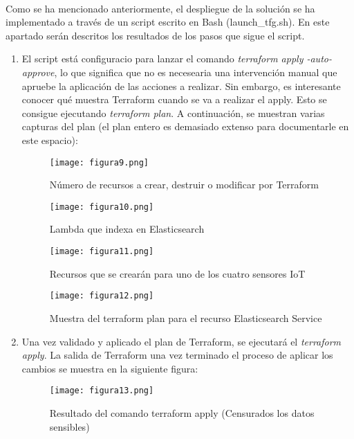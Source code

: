 \documentclass[../../memoria.tex]{subfiles}
\begin{document}
\paragraph{}
Como se ha mencionado anteriormente, el despliegue de la solución se ha implementado a través de un script escrito en Bash (launch\_tfg.sh). En este apartado serán descritos los resultados de los pasos que sigue el script.

\begin{enumerate}
    \item El script está configuracio para lanzar el comando \textit{terraform apply -auto-approve}, lo que significa que no es necesearia una intervención manual que apruebe la aplicación de las acciones a realizar. Sin embargo, es interesante conocer qué muestra Terraform cuando se va a realizar el apply. Esto se consigue ejecutando \textit{terraform plan}. A continuación, se muestran varias capturas del plan (el plan entero es demasiado extenso para documentarle en este espacio):
          \begin{figure}[H]
              \centering
              \texttt{[image: figura9.png]}
              \caption{Número de recursos a crear, destruir o modificar por Terraform}
              \label{fig:figura9}
          \end{figure}
          \begin{figure}[H]
              \centering
              \texttt{[image: figura10.png]}
              \caption{Lambda que indexa en Elasticsearch}
              \label{fig:figura10}
          \end{figure}
          \begin{figure}[H]
              \centering
              \texttt{[image: figura11.png]}
              \caption{Recursos que se crearán para uno de los cuatro sensores IoT}
              \label{fig:figura11}
          \end{figure}
          \begin{figure}[H]
              \centering
              \texttt{[image: figura12.png]}
              \caption{Muestra del terraform plan para el recurso Elasticsearch Service}
              \label{fig:figura12}
          \end{figure}

    \item Una vez validado y aplicado el plan de Terraform, se ejecutará el \textit{terraform apply}. La salida de Terraform una vez terminado el proceso de aplicar los cambios se muestra en la siguiente figura:
          \begin{figure}[H]
              \centering
              \texttt{[image: figura13.png]}
              \caption{Resultado del comando terraform apply (Censurados los datos sensibles)}
              \label{fig:figura13}
          \end{figure}


\end{enumerate}
\end{document}
